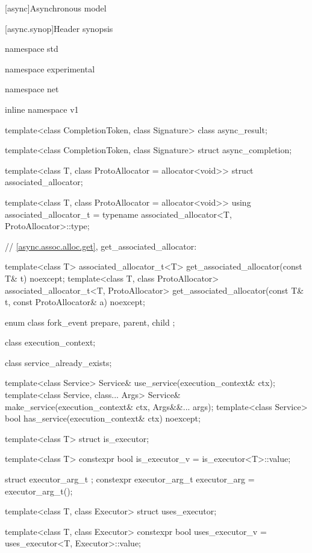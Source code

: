 
[async]{Asynchronous model}


%
[async.synop]{Header  synopsis}

%
%
%
%
\begin{codeblock}
namespace std {
namespace experimental {
namespace net {
inline namespace v1 {

  template<class CompletionToken, class Signature>
    class async_result;

  template<class CompletionToken, class Signature>
    struct async_completion;

  template<class T, class ProtoAllocator = allocator<void>>
    struct associated_allocator;

  template<class T, class ProtoAllocator = allocator<void>>
    using associated_allocator_t = typename associated_allocator<T, ProtoAllocator>::type;

  // \ref{async.assoc.alloc.get}, get_associated_allocator:

  template<class T>
    associated_allocator_t<T> get_associated_allocator(const T& t) noexcept;
  template<class T, class ProtoAllocator>
    associated_allocator_t<T, ProtoAllocator>
      get_associated_allocator(const T& t, const ProtoAllocator& a) noexcept;

  enum class fork_event {
    prepare,
    parent,
    child
  };

  class execution_context;

  class service_already_exists;

  template<class Service> Service& use_service(execution_context& ctx);
  template<class Service, class... Args> Service&
    make_service(execution_context& ctx, Args&&... args);
  template<class Service> bool has_service(execution_context& ctx) noexcept;

  template<class T> struct is_executor;

  template<class T>
    constexpr bool is_executor_v = is_executor<T>::value;

  struct executor_arg_t { };
  constexpr executor_arg_t executor_arg = executor_arg_t();

  template<class T, class Executor> struct uses_executor;

  template<class T, class Executor>
    constexpr bool uses_executor_v = uses_executor<T, Executor>::value;

}}}}
\end{codeblock}
